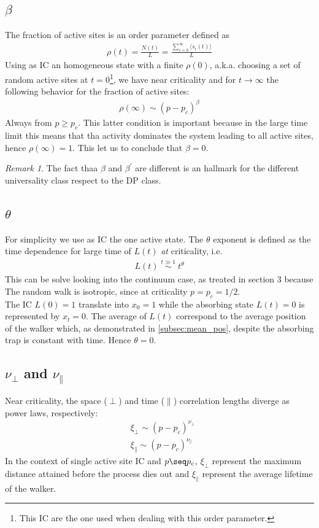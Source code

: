 \documentclass[4apaper,11pt,fleqn]{article}
\theoremstyle{remark}
\newtheorem*{rem}{Remark}
\theoremstyle{definition}
\begin{document}
\subsection{$\beta$}
The fraction of active sites is an order parameter defined as
\begin{align*}
  \rho (t) = \frac{N(t)}{L} = \frac{\sum_{i=0}^{\infty} \langle s_i(t) \rangle }{L}
\end{align*}
Using as IC an homogeneous state with a finite $\rho(0)$,  a.k.a. choosing a set of random active sites at $t=0$\;\footnote{This IC are the one used when dealing with this order parameter.}, we have near criticality and for $t\rightarrow \infty$ the following behavior for the fraction of active sites:
\begin{align*}
  \rho(\infty) \sim (p-p_c)^\beta
\end{align*}
Always from $p \geq p_c$. This latter condition is important because in the large time limit this means that tha activity dominates the system leading to all active sites, hence $\rho(\infty) = 1$.
This let us to conclude that $ \beta = 0$.

\begin{rem}
  The fact thaa $\beta$ and $\beta^\prime$ are different is an hallmark for the different universality class respect to the DP class.
\end{rem}


\subsection{$\theta$}
For simplicity we use as IC the one active state. The $\theta$ exponent is defined as the time dependence for large time of $L(t)$ \emph{at} criticality, i.e.
\begin{align*}
  L(t)\; \overset{t \gg 1}{\sim} \;t^\theta
\end{align*}
This can be solve looking into the continuum case, as treated in section 3 because The random walk is isotropic, since at criticality $p=p_c=1/2$.\\
The IC $L(0) = 1$ translate into $x_0=1$ while the absorbing state $L(t)=0$ is represented by $x_t=0$. The average of $L(t)$ correspond to the average position of the walker which, as demonstrated in \ref{subsec:mean_pos}, despite the absorbing trap is constant with time. Hence $\theta = 0$.


\subsection{$\nu_\perp$ and $\nu_\parallel$}
Near criticality, the space ($\perp$) and time ($\parallel$) correlation lengths diverge as power laws, respectively:
\begin{align*}
  &\xi_{\perp} \sim (p-p_c)^{\nu_\perp} \\
  &\xi_{\parallel} \sim (p-p_c)^{\nu_\parallel}
\end{align*}
In the context of single active site IC and $p \seq p_c$, $\xi_{\perp}$ represent the maximum distance attained before the process dies out and $\xi_{\parallel}$ represent the average lifetime of the walker.
\end{document}
